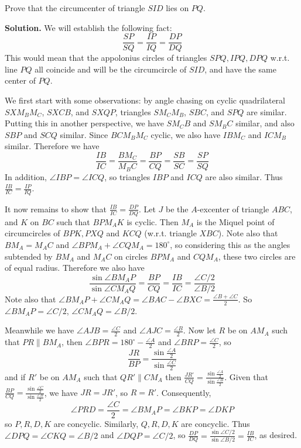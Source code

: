 \documentclass[11pt,a4paper]{article}
\begin{document}
\begin{enumerate}
    	Prove that the circumcenter of triangle \(SID\) lies on \(PQ\).
    	
    	\textbf{Solution.} We will establish the following fact:
    	\[
    	\frac{SP}{SQ} = \frac{IP}{IQ} = \frac{DP}{DQ}
    	\]
    	This would mean that the appolonius circles of triangles 
    	$SPQ, IPQ, DPQ$ w.r.t. line $PQ$ all coincide and will be the circumcircle of $SID$, and have the same center of $PQ$. 
    	
    	We first start with some observations: 
    	by angle chasing on cyclic quadrilateral $SXM_BM_C$, $SXCB$, and $SXQP$, triangles $SM_CM_B$, $SBC$, and 
    	$SPQ$ are similar. 
    	Putting this in another perspective, we have $SM_CB$ and $SM_BC$ similar, 
    	and also $SBP$ and $SCQ$ similar. 
    	Since $BCM_BM_C$ cyclic, we also have $IBM_C$ and $ICM_B$ similar. 
    	Therefore we have 
    	\[
    	\frac{IB}{IC} = \frac{BM_C}{M_BC}
    	=\frac{BP}{CQ} = \frac{SB}{SC}=\frac{SP}{SQ}
    	\]
    	In addition, $\angle IBP = \angle ICQ$, so triangles $IBP$ and $ICQ$ are also similar. 
    	Thus $\frac{IB}{IC}=\frac{IP}{IQ}$. 
    	
    	It now remains to show that $\frac{IB}{IC} = \frac{DP}{DQ}$. 
    	Let $J$ be the $A$-excenter of triangle $ABC$, 
    	and $K$ on $BC$ such that $BPM_AK$ is cyclic. 
    	Then $M_A$ is the Miquel point of circumcircles of $BPK, PXQ$ and $KCQ$ (w.r.t. triangle $XBC$). 
    	Note also that $BM_A=M_AC$ and $\angle BPM_A+\angle CQM_A=180^{\circ}$, 
    	so considering this as the angles subtended by $BM_A$ and $M_AC$ on circles $BPM_A$ and $CQM_A$, 
    	these two circles are of equal radius. 
    	Therefore we also have 
    	\[
    	\frac{\sin\angle BM_AP}{\sin\angle CM_AQ}
    	=\frac{BP}{CQ}=\frac{IB}{IC}=\frac{\angle C/2}{\angle B/2}
    	\]
    	Note also that $\angle BM_AP+\angle CM_AQ=\angle BAC - \angle BXC = \frac{\angle B+\angle C}{2}$. 
    	So $\angle BM_AP = \angle C/2$, 
    	$\angle CM_AQ = \angle B/2$. 
    	
    	Meanwhile we have $\angle AJB = \frac{\angle C}{2}$ and $\angle AJC = \frac{\angle B}{2}$. 
    	Now let $R$ be on $AM_A$ such that $PR\parallel BM_A$, 
    	then $\angle BPR=180^{\circ}-\frac{\angle A}{2}$ and $\angle BRP = \frac{\angle C}{2}$, so 
    	\[
    	\frac{JR}{BP}=\frac{\sin\frac{\angle A}{2}}{\sin\frac{\angle C}{2}}
    	\]
    	and if $R'$ be on $AM_A$ such that $QR'\parallel CM_A$ then $\frac{JR'}{CQ}=\frac{\sin\frac{\angle A}{2}}{\sin\frac{\angle B}{2}}$. 
    	Given that $\frac{BP}{CQ}=\frac{\sin\frac{\angle C}{2}}{\sin\frac{\angle B}{2}}$, 
    	we have $JR=JR'$, so $R=R'$. 
    	Consequently, 
    	\[
    	\angle PRD = \frac{\angle C}{2}
    	= \angle BM_AP=\angle BKP=\angle DKP
    	\]
    	so $P, R, D, K$ are concyclic. 
    	Similarly, $Q, R, D, K$ are concyclic. 
    	Thus $\angle DPQ = \angle CKQ=\angle B/2$ and $\angle DQP = \angle C/2$, 
    	so $\frac{DP}{DQ} = \frac{\sin\angle C/2}{\sin\angle B/2} = \frac{IB}{IC}$, 
    	as desired. 
    	

\end{enumerate}
\end{document}

